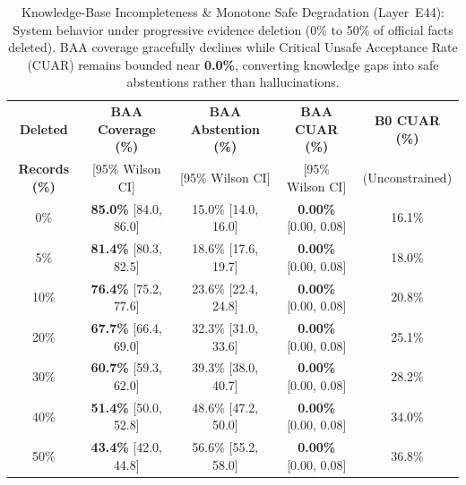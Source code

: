 \begin{table}[t]
\centering\small
\caption{Knowledge-Base Incompleteness & Monotone Safe Degradation (Layer~E44): System behavior under progressive evidence deletion (0\% to 50\% of official facts deleted). BAA coverage gracefully declines while Critical Unsafe Acceptance Rate (CUAR) remains bounded near \textbf{0.0\%}, converting knowledge gaps into safe abstentions rather than hallucinations.}
\label{tab:kb_incompleteness_degradation}
\begin{tabular}{ccccc}
\toprule
\textbf{Deleted} & \textbf{BAA Coverage (\%)} & \textbf{BAA Abstention (\%)} & \textbf{BAA CUAR (\%)} & \textbf{B0 CUAR (\%)} \\
\textbf{Records (\%)} & [95\% Wilson CI] & [95\% Wilson CI] & [95\% Wilson CI] & (Unconstrained) \\
\midrule
0\% & \textbf{85.0\%} [84.0, 86.0] & 15.0\% [14.0, 16.0] & \textbf{0.00\%} [0.00, 0.08] & 16.1\% \\
5\% & \textbf{81.4\%} [80.3, 82.5] & 18.6\% [17.6, 19.7] & \textbf{0.00\%} [0.00, 0.08] & 18.0\% \\
10\% & \textbf{76.4\%} [75.2, 77.6] & 23.6\% [22.4, 24.8] & \textbf{0.00\%} [0.00, 0.08] & 20.8\% \\
20\% & \textbf{67.7\%} [66.4, 69.0] & 32.3\% [31.0, 33.6] & \textbf{0.00\%} [0.00, 0.08] & 25.1\% \\
30\% & \textbf{60.7\%} [59.3, 62.0] & 39.3\% [38.0, 40.7] & \textbf{0.00\%} [0.00, 0.08] & 28.2\% \\
40\% & \textbf{51.4\%} [50.0, 52.8] & 48.6\% [47.2, 50.0] & \textbf{0.00\%} [0.00, 0.08] & 34.0\% \\
50\% & \textbf{43.4\%} [42.0, 44.8] & 56.6\% [55.2, 58.0] & \textbf{0.00\%} [0.00, 0.08] & 36.8\% \\
\bottomrule
\end{tabular}
\end{table}
